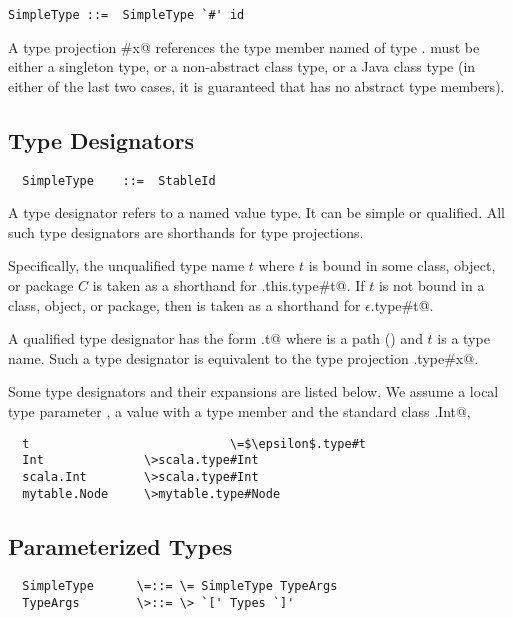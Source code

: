 \documentclass[11pt]{report}
\begin{document}
\syntax\begin{verbatim} 
SimpleType ::=  SimpleType `#' id
\end{verbatim}

A type projection \verb@T#x@ references the type member named 
\verb@x@ of type \verb@T@. \verb@T@ must be either a singleton type,
or a non-abstract class type, or a Java class type (in either of the
last two cases, it is guaranteed that \verb@T@ has no abstract type
members).

\subsection{Type Designators}
\label{sec:type-desig}

\syntax\begin{verbatim}
  SimpleType   	::=  StableId
\end{verbatim}

A type designator refers to a named value type. It can be simple or
qualified. All such type designators are shorthands for type projections.

Specifically, the unqualified type name $t$ where $t$ is bound in some
class, object, or package $C$ is taken as a shorthand for
\verb@C.this.type#t@.  If $t$ is not bound in a class, object, or
package, then \verb@t@ is taken as a shorthand for
\verb@$\epsilon$.type#t@.

A qualified type designator has the form \verb@p.t@ where \verb@p@ is
a path (\sref{}) and $t$ is a type name. Such a type designator is
equivalent to the type projection \verb@p.type#x@.

\example 
Some type designators and their expansions are listed below. We assume
a local type parameter \verb@t@, a value \verb@mytable@
with a type member \verb@Node@ and the standard class \verb@scala.Int@, 
\begin{verbatim}
  t                            \=$\epsilon$.type#t
  Int              \>scala.type#Int
  scala.Int        \>scala.type#Int
  mytable.Node     \>mytable.type#Node
\end{verbatim}

\subsection{Parameterized Types}
\label{sec:param-types}

\syntax\begin{verbatim}
  SimpleType      \=::= \= SimpleType TypeArgs
  TypeArgs        \>::= \> `[' Types `]'
\end{verbatim}
\end{document}
